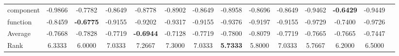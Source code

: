 \begin{threeparttable}
\begin{tabular}{lccccccccccccc}
component &-0.9866 &-0.7782 &-0.8649 &-0.8778 &-0.8902 &-0.8649 &-0.8958 &-0.8696 &-0.8649 &-0.9462 &\textbf{-0.6429} &-0.9449 &  \\
function &-0.8459 &\textbf{-0.6775} &-0.9155 &-0.9202 &-0.9317 &-0.9155 &-0.9376 &-0.9197 &-0.9155 &-0.9729 &-0.7400 &-0.9726 &  \\
\hline
Average &-0.7668 &-0.7828 &-0.7719 &\textbf{-0.6944} &-0.7128 &-0.7719 &-0.7800 &-0.8079 &-0.7719 &-0.7665 &-0.7665 &-0.7447 &  \\
Rank &6.3333 &6.0000 &7.0333 &7.2667 &7.3000 &7.0333 &\textbf{5.7333} &5.8000 &7.0333 &5.7667 &6.2000 &6.5000 &  \\
\bottomrule
\end{tabular}
\end{threeparttable}